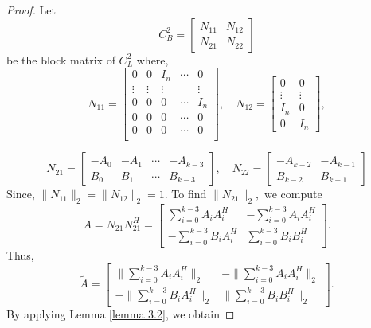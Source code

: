 \documentclass[10pt,a4paper]{amsart}
\begin{document}
\begin{proof}
   Let
\[
C^{2}_{B} = \begin{bmatrix} N_{11} & N_{12} \\ N_{21} & N_{22} \end{bmatrix}
\] be the block matrix of $C^{2}_{L}$
where,
\[
N_{11} = 
\begin{bmatrix}
0 & 0 & I_n & \cdots & 0 \\
\vdots & \vdots  & \vdots &  &\vdots\\
0 & 0 & 0 & \cdots & I_n \\
0 & 0 & 0 & \cdots & 0 \\
0 & 0 & 0 & \cdots & 0 \\
\end{bmatrix}, \quad N_{12} = 
\begin{bmatrix}
0 &0 \\
\vdots&\vdots \\
I_n & 0\\ 0 & I_{n}
\end{bmatrix},
\]

\[
N_{21} = 
\begin{bmatrix}
-A_0 & -A_1 & \cdots & -A_{k-3}\\
B_0 & B_1 & \cdots & B_{k-3}
\end{bmatrix}, \quad N_{22} = \begin{bmatrix}
    -A_{k-2}&-A_{k-1}\\B_{k-2}&B_{k-1}\end{bmatrix}
\]
Since, $\|N_{11}\|_{2}=\|N_{12}\|_{2}=1.$
To find $\|N_{21}\|_{2},$ we compute  \[
A=N_{21}N_{21}^{H} = 
\begin{bmatrix}
\sum_{i=0}^{k-3} A_{i}A_{i}^{H}& -\sum_{i=0}^{k-3}A_{i}A_{i}^{H}  \\
 -\sum_{i=0}^{k-3} B_{i}A_{i}^{H}& \sum_{i=0}^{k-3} B_{i}B_{i}^{H}
\end{bmatrix}. \]
Thus, \[\tilde{A}= 
\begin{bmatrix}
\|\sum_{i=0}^{k-3} A_{i}A_{i}^{H}\|_{2}& -\|\sum_{i=0}^{k-3}A_{i}A_{i}^{H}\|_{2}  \\
 -\|\sum_{i=0}^{k-3} B_{i}A_{i}^{H}\|_{2}& \|\sum_{i=0}^{k-3} B_{i}B_{i}^{H}\|_{2}
\end{bmatrix}. \] By applying Lemma \ref{lemma 3.2}, we obtain 


\end{proof}
\end{document}
